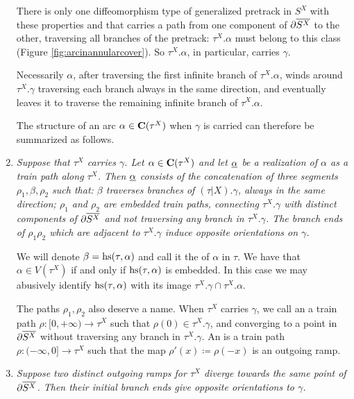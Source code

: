 \begin{rmk}
\begin{enumerate}
There is only one diffeomorphism type of generalized pretrack in $S^X$ with these properties and that carries a path from one component of $\partial\overline{S^X}$ to the other, traversing all branches of the pretrack: $\tau^X.\alpha$ must belong to this class (Figure \ref{fig:arcinannularcover}). So $\tau^X.\alpha$, in particular, carries $\gamma$.

Necessarily $\alpha$, after traversing the first infinite branch of $\tau^X.\alpha$, winds around $\tau^X.\gamma$ traversing each branch always in the same direction, and eventually leaves it to traverse the remaining infinite branch of $\tau^X.\alpha$.

The structure of an arc $\alpha\in \mathbf C(\tau^X)$ when $\gamma$ is carried can therefore be summarized as follows.

\item \label{itm:horizontalstretch} \textit{Suppose that $\tau^X$ carries $\gamma$. Let $\alpha\in\mathbf C(\tau^X)$ and let $\underline{\alpha}$ be a realization of $\alpha$ as a train path along $\tau^X$. Then $\underline{\alpha}$ consists of the concatenation of three segments $\rho_1,\beta,\rho_2$ such that: $\beta$ traverses branches of $(\tau|X).\gamma$, always in the same direction; $\rho_1$ and $\rho_2$ are embedded train paths, connecting $\tau^X.\gamma$ with distinct components of $\partial\overline{S^X}$ and not traversing any branch in $\tau^X.\gamma$. The branch ends of $\rho_1\rho_2$ which are adjacent to $\tau^X.\gamma$ induce opposite orientations on $\gamma$.}

We will denote $\beta=\mathrm{hs}(\tau,\alpha)$ and call it the  of $\alpha$ in $\tau$. We have that $\alpha\in V(\tau^X)$ if and only if $\mathrm{hs}(\tau,\alpha)$ is embedded. In this case we may abusively identify $\mathrm{hs}(\tau,\alpha)$ with its image $\tau^X.\gamma\cap\tau^X.\alpha$.

The paths $\rho_1,\rho_2$ also deserve a name. When $\tau^X$ carries $\gamma$, we call an  a train path $\rho:[0,+\infty)\rightarrow \tau^X$ such that $\rho(0)\in\tau^X.\gamma$, and converging to a point in $\partial\overline{S^X}$ without traversing any branch in $\tau^X.\gamma$. An  is a train path $\rho:(-\infty,0]\rightarrow \tau^X$ such that the map $\rho'(x)\coloneqq \rho(-x)$ is an outgoing ramp.

\item\label{itm:dataforramp} \textit{Suppose two distinct outgoing ramps for $\tau^X$ diverge towards the same point of $\partial\overline{S^X}$. Then their initial branch ends give opposite orientations to $\gamma$.}


\end{enumerate}
\end{rmk}
